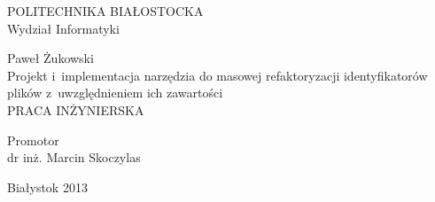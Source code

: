 \begin{titlepage}
	\begin{center}
	\vspace{3cm}
	\fontsize{25pt}{31pt}\selectfont
	POLITECHNIKA BIAŁOSTOCKA \\
	\vspace*{.5\baselineskip}
	\fontsize{24pt}{18pt}\selectfont
	Wydział Informatyki

	\vspace*{3\baselineskip}
	\fontsize{32pt}{20pt}\selectfont
	Paweł Żukowski\\
	\vspace*{\baselineskip}
	\fontsize{20pt}{15pt}\selectfont
	Projekt i~implementacja narzędzia do masowej refaktoryzacji identyfikatorów plików z~uwzględnieniem ich zawartości\\
	\vspace*{\baselineskip}
	\fontsize{15pt}{18pt}\selectfont
	PRACA INŻYNIERSKA \\
	\end{center}
	\vspace*{\baselineskip}
	\vspace*{3\baselineskip}
	\begin{flushright}
	\fontsize{18pt}{10pt}\selectfont
	Promotor\\
	dr inż. Marcin Skoczylas\\
	\end{flushright}
	
	\vspace*{4\baselineskip}
	\begin{center}
	Białystok 2013
	\end{center}

%
%
%
%
%
%

\end{titlepage}
